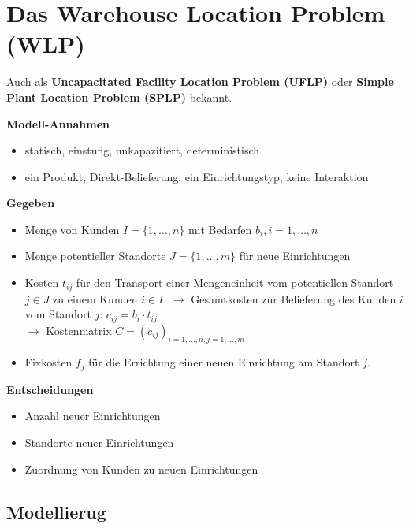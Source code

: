   \section{Das Warehouse Location Problem (WLP)} %
  \label{sec:das_warehouse_location_problem_}

    \par Auch als \textbf{Uncapacitated Facility Location Problem (UFLP)} oder \textbf{Simple Plant Location Problem (SPLP)} bekannt.

    \par \textbf{Modell-Annahmen}
    \begin{itemize}
      \item statisch, einstufig, unkapazitiert, deterministisch
      \item ein Produkt, Direkt-Belieferung, ein Einrichtungstyp, keine Interaktion
    \end{itemize}

    \par \textbf{Gegeben}
    \begin{itemize}
      \item Menge von Kunden $I = \{1, \dots, n\}$ mit Bedarfen $b_i, i = 1, \dots, n$
      \item Menge potentieller Standorte $J = \{1, \dots, m\}$ für neue Einrichtungen
      \item Kosten $t_{ij}$ für den Transport einer Mengeneinheit vom potentiellen Standort $j \in J$ zu einem Kunden $i \in I$.
      $\rightarrow$ Gesamtkosten zur Belieferung des Kunden $i$ vom Standort $j$: $c_{ij} = b_i \cdot t_{ij}$ \\$\rightarrow$ Kostenmatrix $C = (c_{ij})_{i = 1, \dots, n, j = 1, \dots, m}$
      \item Fixkosten $f_j$ für die Errichtung einer neuen Einrichtung am Standort $j$.
    \end{itemize}

    \par \textbf{Entscheidungen}
    \begin{itemize}
      \item Anzahl neuer Einrichtungen
      \item Standorte neuer Einrichtungen
      \item Zuordnung von Kunden zu neuen Einrichtungen
    \end{itemize}


    \subsection{Modellierug} %
    \label{sub:modellierug}


